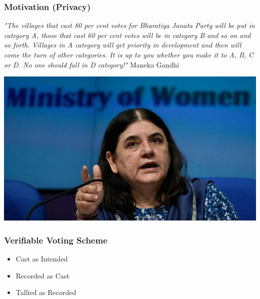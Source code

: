\documentclass{beamer}
\begin{document}
\begin{frame}
\frametitle{Motivation (Privacy)}
\textit{"The villages that cast 80 per cent votes for 
Bharatiya Janata Party will be put in category A, those that cast 60 per cent votes will be in category B and so on and so forth. Villages in A category will get priority in development and then will come the turn of other categories. It is up to you whether you make it to A, B, C or D. No one should fall in D category!"} Maneka Gandhi
\begin{center}
\includegraphics[scale=0.3]{menka.jpg}
\end{center}
\end{frame}

\begin{frame}
\frametitle{Verifiable Voting Scheme}
\begin{itemize}
\item Cast as Intended 
\item Recorded as Cast
\item Tallied as Recorded 
\end{itemize}
\end{frame}
\end{document}
